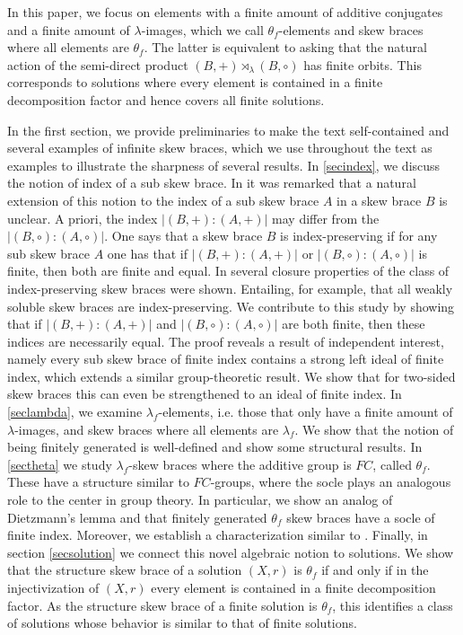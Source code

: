 \documentclass{amsart}
\begin{document}
In this paper, we focus on elements with a finite amount of additive conjugates and a finite amount of $\lambda$-images, which we call $\theta_f$-elements and skew braces where all elements are $\theta_f$. The latter is equivalent to asking that the natural action of the semi-direct product $(B,+)\rtimes_\lambda (B,\circ)$ has finite orbits. This corresponds to solutions where every element is contained in a finite decomposition factor and hence covers all finite solutions.

In the first section, we provide preliminaries to make the text self-contained and several examples of infinite skew braces, which we use throughout the text as examples to illustrate the sharpness of several results. 
In \cref{secindex}, we discuss the notion of index of a sub skew brace. 
In \cite{index} it was remarked that a natural extension of this notion to the index of a sub skew brace $A$ in a skew brace $B$ is unclear.
A priori, the index $|(B,+):(A,+)|$  may differ from the $|(B,\circ):(A,\circ)|$. One says that a skew brace $B$ is index-preserving if for any sub skew brace $A$ one has that if $|(B,+):(A,+)|$ or $|(B,\circ):(A,\circ)|$ is finite, then both are finite and equal. 
In \cite{index,dedekind} several closure properties of the class of index-preserving skew braces were shown. 
Entailing, for example, that all weakly soluble skew braces are index-preserving.
We contribute to this study by showing that if $|(B,+):(A,+)|$ and $|(B,\circ):(A,\circ)|$ are both finite, then these indices are necessarily equal. 
The proof reveals a result of independent interest, namely every sub skew brace of finite index contains a strong left ideal of finite index, which extends a similar group-theoretic result.
We show that for two-sided skew braces this can even be strengthened to an ideal of finite index. 
In \cref{seclambda}, we examine $\lambda_f$-elements, i.e. those that only have a finite amount of $\lambda$-images, and skew braces where all elements are $\lambda_f$. We show that the notion of being finitely generated is well-defined and show some structural results. 
In \cref{sectheta} we study $\lambda_f$-skew braces where the additive group is $FC$, called $\theta_f$.
These have a structure similar to $FC$-groups, where the socle plays an analogous role to the center in group theory.
In particular, we show an analog of Dietzmann's lemma and that finitely generated $\theta_f$ skew braces have a socle of finite index.
Moreover, we establish a characterization similar to \cite[Theorem 2]{FC}. 
Finally, in section \cref{secsolution} we connect this novel algebraic notion to solutions. We show that the structure skew brace of a solution $(X,r)$ is $\theta_f$ if and only if in the injectivization of $(X,r)$ every element is contained in a finite decomposition factor. As the structure skew brace of a finite solution is $\theta_f$, this identifies a class of solutions whose behavior is similar to that of finite solutions.
\end{document}

